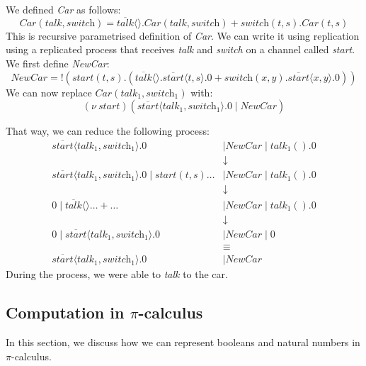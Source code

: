 \documentclass[a4paper, openany]{memoir}
\theoremstyle{definition}
\begin{document}

    We defined \textit{Car} as follows:
    \[\textit{Car}(\textit{talk}, \textit{switch}) = \overline{\textit{talk}} \langle \rangle.\textit{Car} (\textit{talk}, \textit{switch}) + \textit{switch} (t, s).\textit{Car}(t, s)\]
    This is recursive parametrised definition of \textit{Car}. We can write it using replication using a replicated process that receives \textit{talk} and \textit{switch} on a channel called \textit{start}. We first define \textit{NewCar}:
    \[\textit{NewCar} = !(\textit{start}(t, s).(
        \overline{\textit{talk}} \langle \rangle.\overline{\textit{start}}\langle t, s \rangle.0 + 
        \textit{switch}(x, y).\overline{start} \langle x, y \rangle.0
    ))\]
    We can now replace $\textit{Car}(\textit{talk}_1, \textit{switch}_1)$ with:
    \[(\nu \ \textit{start})(\overline{\textit{start}} \langle \textit{talk}_1, \textit{switch}_1 \rangle.0 \mid \textit{NewCar})\]

    That way, we can reduce the following process:
    \begin{align*}
        \overline{\textit{start}} \langle \textit{talk}_1, \textit{switch}_1 \rangle.0 &\mid \textit{NewCar} \mid \textit{talk}_1().0 \\
        &\downarrow \\
        \overline{\textit{start}} \langle \textit{talk}_1, \textit{switch}_1 \rangle.0 \mid \textit{start}(t, s)\dots &\mid \textit{NewCar} \mid \textit{talk}_1().0 \\
        &\downarrow \\
        0 \mid \overline{\textit{talk}} \langle \rangle \dots + \dots &\mid \textit{NewCar} \mid \textit{talk}_1().0 \\
        &\downarrow \\
        0 \mid \overline{\textit{start}} \langle \textit{talk}_1, \textit{switch}_1 \rangle.0 &\mid \textit{NewCar} \mid 0 \\
        &\equiv \\
        \overline{\textit{start}} \langle \textit{talk}_1, \textit{switch}_1 \rangle.0 &\mid \textit{NewCar}
    \end{align*}
    During the process, we were able to \textit{talk} to the car.

    \subsection{Computation in $\pi$-calculus}
    In this section, we discuss how we can represent booleans and natural numbers in $\pi$-calculus.
\end{document}
